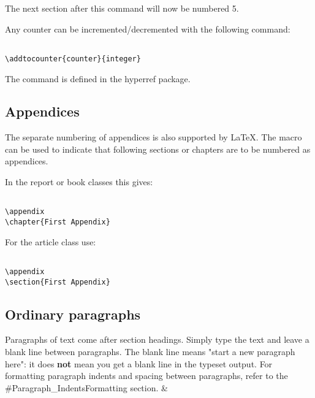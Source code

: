 The next section after this command will now be numbered 5.

Any counter can be incremented/decremented with the following command:

\begin{lstlisting}

\addtocounter{counter}{integer}

\end{lstlisting}


The  command is defined in the hyperref package.

\subsection{ Appendices }
The separate numbering of appendices is also supported by LaTeX. The \texttt{\appendix} macro can be used to indicate that following sections or chapters are to be numbered as appendices.

In the report or book classes this gives:

\begin{lstlisting}

\appendix
\chapter{First Appendix}

\end{lstlisting}


For the article class use:

\begin{lstlisting}

\appendix
\section{First Appendix}

\end{lstlisting}


\subsection{ Ordinary paragraphs }
Paragraphs of text come after section headings. Simply type the text and leave a blank line between paragraphs. The blank line means "start a new paragraph here": it does \textbf{not} mean you get a blank line in the typeset output. For formatting paragraph indents and spacing between paragraphs, refer to the #Paragraph\_IndentsFormatting section. &

